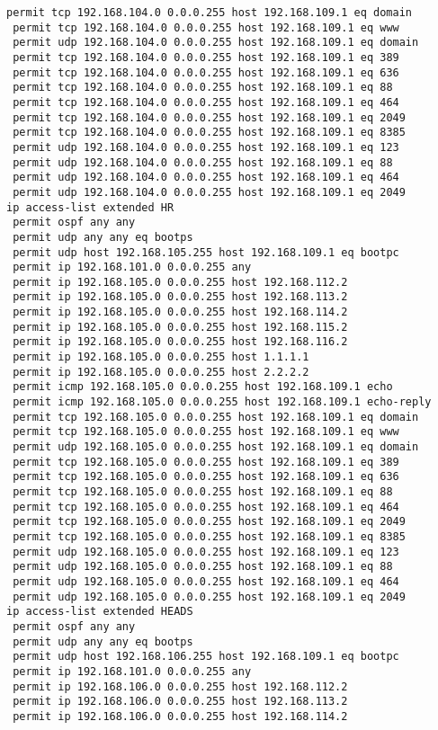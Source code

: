 \documentclass[14pt, a4paper]{extarticle}
\begin{document}
\begin{appendices}
\begin{lstlisting}[caption=Конфигурация устройства SW\_2\_L3\_IVANOV\label{list:conf_sw2_l3}]
 permit tcp 192.168.104.0 0.0.0.255 host 192.168.109.1 eq domain
 permit tcp 192.168.104.0 0.0.0.255 host 192.168.109.1 eq www
 permit udp 192.168.104.0 0.0.0.255 host 192.168.109.1 eq domain
 permit tcp 192.168.104.0 0.0.0.255 host 192.168.109.1 eq 389
 permit tcp 192.168.104.0 0.0.0.255 host 192.168.109.1 eq 636
 permit tcp 192.168.104.0 0.0.0.255 host 192.168.109.1 eq 88
 permit tcp 192.168.104.0 0.0.0.255 host 192.168.109.1 eq 464
 permit tcp 192.168.104.0 0.0.0.255 host 192.168.109.1 eq 2049
 permit tcp 192.168.104.0 0.0.0.255 host 192.168.109.1 eq 8385
 permit udp 192.168.104.0 0.0.0.255 host 192.168.109.1 eq 123
 permit udp 192.168.104.0 0.0.0.255 host 192.168.109.1 eq 88
 permit udp 192.168.104.0 0.0.0.255 host 192.168.109.1 eq 464
 permit udp 192.168.104.0 0.0.0.255 host 192.168.109.1 eq 2049
ip access-list extended HR
 permit ospf any any
 permit udp any any eq bootps
 permit udp host 192.168.105.255 host 192.168.109.1 eq bootpc
 permit ip 192.168.101.0 0.0.0.255 any
 permit ip 192.168.105.0 0.0.0.255 host 192.168.112.2
 permit ip 192.168.105.0 0.0.0.255 host 192.168.113.2
 permit ip 192.168.105.0 0.0.0.255 host 192.168.114.2
 permit ip 192.168.105.0 0.0.0.255 host 192.168.115.2
 permit ip 192.168.105.0 0.0.0.255 host 192.168.116.2
 permit ip 192.168.105.0 0.0.0.255 host 1.1.1.1
 permit ip 192.168.105.0 0.0.0.255 host 2.2.2.2
 permit icmp 192.168.105.0 0.0.0.255 host 192.168.109.1 echo
 permit icmp 192.168.105.0 0.0.0.255 host 192.168.109.1 echo-reply
 permit tcp 192.168.105.0 0.0.0.255 host 192.168.109.1 eq domain
 permit tcp 192.168.105.0 0.0.0.255 host 192.168.109.1 eq www
 permit udp 192.168.105.0 0.0.0.255 host 192.168.109.1 eq domain
 permit tcp 192.168.105.0 0.0.0.255 host 192.168.109.1 eq 389
 permit tcp 192.168.105.0 0.0.0.255 host 192.168.109.1 eq 636
 permit tcp 192.168.105.0 0.0.0.255 host 192.168.109.1 eq 88
 permit tcp 192.168.105.0 0.0.0.255 host 192.168.109.1 eq 464
 permit tcp 192.168.105.0 0.0.0.255 host 192.168.109.1 eq 2049
 permit tcp 192.168.105.0 0.0.0.255 host 192.168.109.1 eq 8385
 permit udp 192.168.105.0 0.0.0.255 host 192.168.109.1 eq 123
 permit udp 192.168.105.0 0.0.0.255 host 192.168.109.1 eq 88
 permit udp 192.168.105.0 0.0.0.255 host 192.168.109.1 eq 464
 permit udp 192.168.105.0 0.0.0.255 host 192.168.109.1 eq 2049
ip access-list extended HEADS
 permit ospf any any
 permit udp any any eq bootps
 permit udp host 192.168.106.255 host 192.168.109.1 eq bootpc
 permit ip 192.168.101.0 0.0.0.255 any
 permit ip 192.168.106.0 0.0.0.255 host 192.168.112.2
 permit ip 192.168.106.0 0.0.0.255 host 192.168.113.2
 permit ip 192.168.106.0 0.0.0.255 host 192.168.114.2

\end{lstlisting}
\end{appendices}
\end{document}
